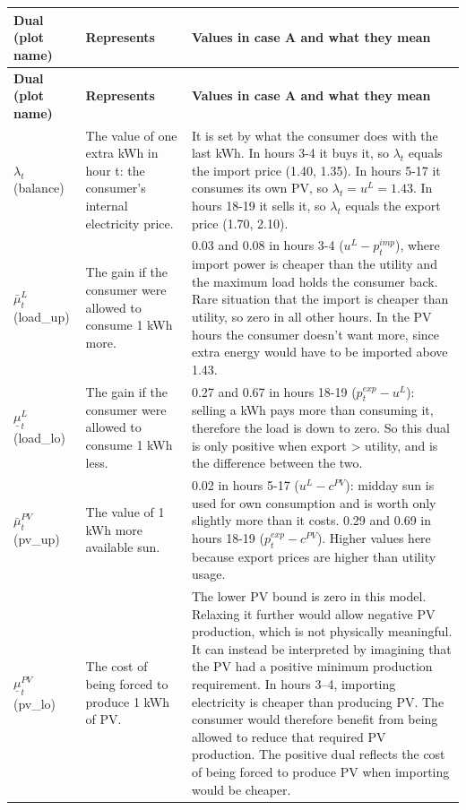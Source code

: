 \begin{xltabular}{\textwidth}{|p{3.2cm}|p{5cm}|X|}
\hline
\textbf{Dual (plot name)} & \textbf{Represents} & \textbf{Values in case A and what they mean} \\
\hline
\endfirsthead

\hline
\textbf{Dual (plot name)} & \textbf{Represents} & \textbf{Values in case A and what they mean} \\
\hline
\endhead

$\lambda_t$ (balance)
&
The value of one extra kWh in hour t: the consumer's internal electricity price.
&
It is set by what the consumer does with the last kWh. In hours 3-4 it buys it, so $\lambda_t$ equals the import price (1.40, 1.35). In hours 5-17 it consumes its own PV, so $\lambda_t = u^L = 1.43$. In hours 18-19 it sells it, so $\lambda_t$ equals the export price (1.70, 2.10).
\\
\hline

$\bar{\mu}^L_t$ (load\_up)
&
The gain if the consumer were allowed to consume 1 kWh more.
&
0.03 and 0.08 in hours 3-4 ($u^L - p^{imp}_t$), where import power is cheaper than the utility and the maximum load holds the consumer back. Rare situation that the import is cheaper than utility, so zero in all other hours. In the PV hours the consumer doesn't want more, since extra energy would have to be imported above 1.43.
\\
\hline

$\underline{\mu}^L_t$ (load\_lo)
&
The gain if the consumer were allowed to consume 1 kWh less.
&
0.27 and 0.67 in hours 18-19 ($p^{exp}_t - u^L$): selling a kWh pays more than consuming it, therefore the load is down to zero. So this dual is only positive when export > utility, and is the difference between the two.
\\
\hline

$\bar{\mu}^{PV}_t$ (pv\_up)
&
The value of 1 kWh more available sun.
&
0.02 in hours 5-17 ($u^L - c^{PV}$): midday sun is used for own consumption and is worth only slightly more than it costs. 0.29 and 0.69 in hours 18-19 ($p^{exp}_t - c^{PV}$). Higher values here because export prices are higher than utility usage. 
\\
\hline

$\underline{\mu}^{PV}_t$ (pv\_lo)
&
The cost of being forced to produce 1 kWh of PV.
&
The lower PV bound is zero in this model. Relaxing it further would allow negative PV production, which is not physically meaningful. It can instead be interpreted by imagining that the PV had a positive minimum production requirement. In hours 3--4, importing
electricity is cheaper than producing PV. The consumer would therefore benefit from being allowed to reduce that required PV production. The positive dual reflects the cost of being
forced to produce PV when importing would be cheaper.
\\
\hline


\end{xltabular}
